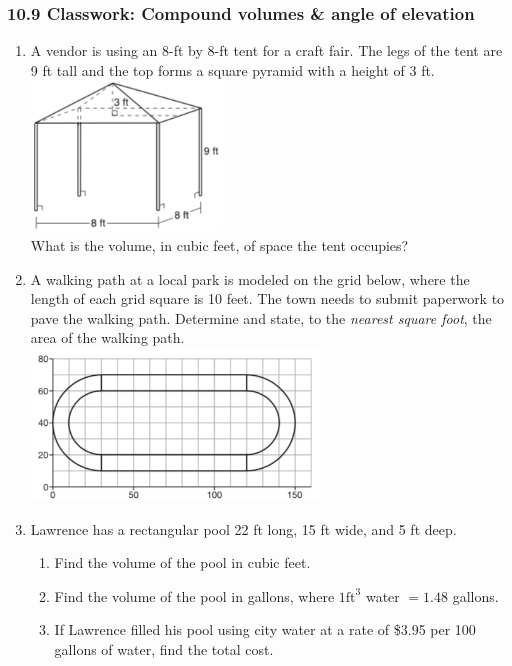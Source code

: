 \documentclass[12pt, twoside]{article}
\begin{document}
\subsubsection*{10.9 Classwork: Compound volumes \& angle of elevation}
 \begin{enumerate}

  \item A vendor is using an 8-ft by 8-ft tent for a craft fair. The legs of the tent are 9 ft tall and the top forms a square pyramid with a height of 3 ft.\\[1cm]
    \includegraphics[width=0.4\textwidth]{tent_Jan2019-9.png}\\[0.5cm]
    What is the volume, in cubic feet, of space the tent occupies? \vspace{3cm}

  \item A walking path at a local park is modeled on the grid below, where the length of each grid square is 10 feet. The town needs to submit paperwork to pave the walking path. Determine and state, to the \emph{nearest square foot}, the area of the walking path.\\[0.3cm]
    \includegraphics[width=0.6\textwidth]{path_Jan2019-31.png} \vspace{3cm}

  \item Lawrence has a rectangular pool 22 ft long, 15 ft wide, and 5 ft deep.
    \begin{enumerate}
      \item Find the volume of the pool in cubic feet. \vspace{2cm}
      \item Find the volume of the pool in gallons, where $1 \mathrm{ ft}^3$ water $= 1.48$ gallons. \vspace{2cm}
      \item If Lawrence filled his pool using city water at a rate of \$3.95 per 100 gallons of water, find the total cost.
    \end{enumerate} \vspace{2cm}


\end{enumerate}
\end{document}
